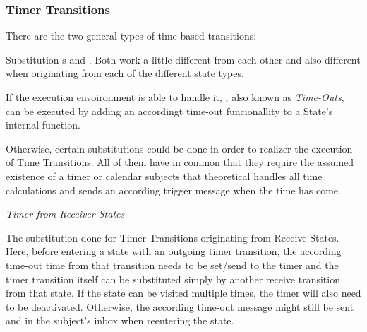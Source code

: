 \subsubsection{Timer Transitions}

There are the two general types of time based transitions:

Substitution  s and . Both work a little different from each other and also different when originating from each of the different state types.

If the execution envoironment is able to handle it, , also known as \textit{Time-Outs}, can be executed by adding an accordingt time-out funcionallity to a State's internal function.

Otherwise, certain substitutions could be done in order to realizer the execution of Time Transitions. All of them have in common that they require the assumed existence of a timer or calendar subjects that theoretical handles all time calculations and sends an according trigger message when the time has come.

\emph{Timer from Receiver States}

The substitution done for Timer Transitions originating from Receive States. Here, before entering a state with an outgoing timer transition, the according time-out time from that transition needs to be set/send to the timer and the timer transition itself can be substituted simply by another receive transition from that state. If the state can be visited multiple times, the timer will also need to be deactivated. Otherwise, the according time-out message might still be sent and in the subject's inbox when reentering the state.

